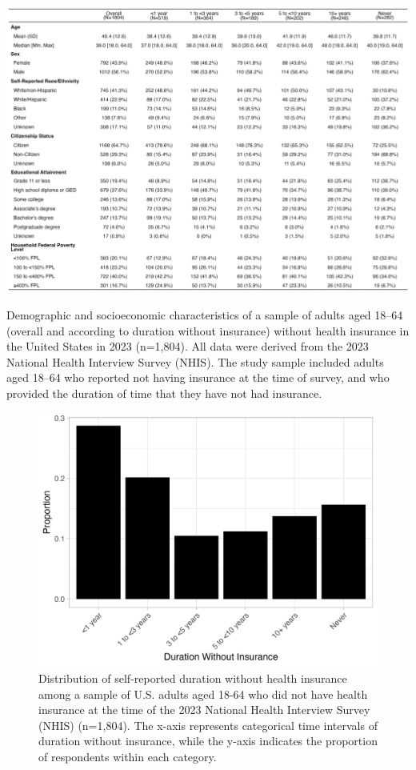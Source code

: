 \documentclass[12pt]{article}
\begin{document}
\begin{table}
  \centering
  \includegraphics[width=22cm]{figures/table_1.png}
  \caption{Demographic and socioeconomic characteristics of a sample of adults aged 18–64 (overall and according to duration without insurance) without health insurance in the United States in 2023 (n=1,804). All data were derived from the 2023 National Health Interview Survey (NHIS). The study sample included adults aged 18–64 who reported not having insurance at the time of survey, and who provided the duration of time that they have not had insurance.}
\end{table}

\begin{figure}[H]
  \centering
  \includegraphics[width=15cm]{figures/duration_no_insurance.png}
  \caption{Distribution of self-reported duration without health insurance among a sample of U.S. adults aged 18-64 who did not have health insurance at the time of the 2023 National Health Interview Survey (NHIS) (n=1,804). The x-axis represents categorical time intervals of duration without insurance, while the y-axis indicates the proportion of respondents within each category.}
\end{figure}
\end{document}
